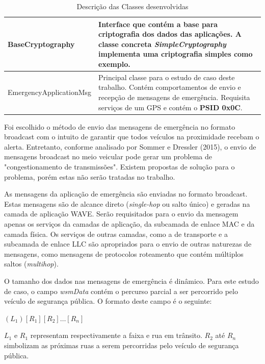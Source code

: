 \documentclass[
12pt,				%
openright,			%
oneside,			%
a4paper,			%
brazil,				%
]{abntex2}
\begin{document}
\begin{table}[H]
\begin{tabular}{|p{4.8cm}|p{10.2cm}|}
    		BaseCryptography & Interface que contém a base para criptografia dos dados das aplicações. A classe concreta \textit{SimpleCryptography} implementa uma criptografia simples como exemplo. \\ \hline
    		EmergencyApplicationMsg & Principal classe para o estudo de caso deste trabalho. Contém comportamentos de envio e recepção de mensagens de emergência. Requisita serviços de um GPS e contém o \textbf{PSID 0x0C}. \\ \hline
    	\end{tabular}
		   \caption{Descrição das Classes desenvolvidas}
		   \label{tab_5.2}
    \end{table}

    \par Foi escolhido o método de envio das mensagens de emergência no formato broadcast com o intuito de garantir que todos veículos na proximidade recebam o alerta. Entretanto, conforme analisado por Sommer e Dressler (2015), o envio de mensagens broadcast no meio veicular pode gerar um problema de "congestionamento de transmissões". Existem propostas de solução para o problema, porém estas não serão tratadas no trabalho.

	\par As mensagens da aplicação de emergência são enviadas no formato broadcast. Estas mensagens são de alcance direto (\textit{single-hop} ou salto único) e geradas na camada de aplicação WAVE. Serão requisitados para o envio da mensagem apenas os serviços da camadas de aplicação, da subcamada de enlace MAC e da camada física. Os serviços de outras camadas, como a de transporte e a subcamada de enlace LLC são apropriados para o envio de outras naturezas de mensagens, como mensagens de protocolos roteamento que contém múltiplos saltos (\textit{multihop}).

	\par O tamanho dos dados nas mensagens de emergência é dinâmico. Para este estudo de caso, o campo \textit{wsmData} contém o percurso parcial a ser percorrido pelo veículo de segurança pública. O formato deste campo é o seguinte:

	\begin{center} $ (L_1) [R_1] [R_2] … [R_n] $ \end{center}

	\par  $ L_1 $ e $ R_1 $ representam respectivamente a faixa e rua em trânsito. $ R_2 $ até $ R_n $ simbolizam as próximas ruas a serem percorridas pelo veículo de segurança pública. 
\end{document}
